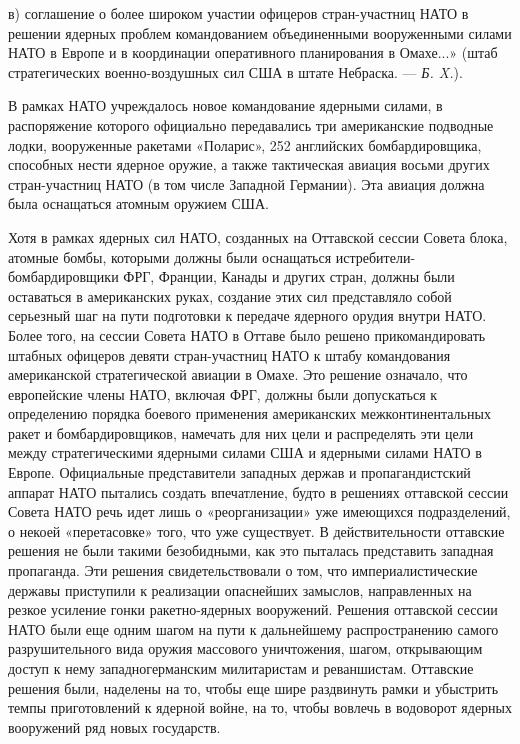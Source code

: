 \documentclass[12pt, a4paper, openany]{book}
\begin{document}
в) соглашение о более широком участии офицеров стран-участниц НАТО в решении ядерных проблем командованием объединенными вооруженными силами НАТО в Европе и в координации оперативного планирования в Омахе...» (штаб стратегических военно-воздушных сил США в штате Небраска. — \textit{Б. X.}).

В рамках НАТО учреждалось новое командование ядерными силами, в распоряжение которого официально передавались три американские подводные лодки, вооруженные ракетами «Поларис», 252 английских бомбардировщика, способных нести ядерное оружие, а также тактическая авиация восьми других стран-участниц НАТО (в том числе Западной Германии). Эта авиация должна была оснащаться атомным оружием США.

Хотя в рамках ядерных сил НАТО, созданных на Оттавской сессии Совета блока, атомные бомбы, которыми должны были оснащаться истребители-бомбардировщики ФРГ, Франции, Канады и других стран, должны были оставаться в американских руках, создание этих сил представляло собой серьезный шаг на пути подготовки к передаче ядерного орудия внутри НАТО. Более того, на сессии Совета НАТО в Оттаве было решено прикомандировать штабных офицеров девяти стран-участниц НАТО к штабу командования американской стратегической авиации в Омахе. Это решение означало, что европейские члены НАТО, включая ФРГ, должны были допускаться к определению порядка боевого применения американских межконтинентальных ракет и бомбардировщиков, намечать для них цели и распределять эти цели между стратегическими ядерными силами США и ядерными силами НАТО в Европе. Официальные представители западных держав и пропагандистский аппарат НАТО пытались создать впечатление, будто в решениях оттавской сессии Совета НАТО речь идет лишь о «реорганизации» уже имеющихся подразделений, о некоей «перетасовке» того, что уже существует. В действительности оттавские решения не были такими безобидными, как это пыталась представить западная пропаганда. Эти решения свидетельствовали о том, что империалистические державы приступили к реализации опаснейших замыслов, направленных на резкое усиление гонки ракетно-ядерных вооружений. Решения оттавской сессии НАТО были еще одним шагом на пути к дальнейшему распространению самого разрушительного вида оружия массового уничтожения, шагом, открывающим доступ к нему западногерманским милитаристам и реваншистам. Оттавские решения были, наделены на то, чтобы еще шире раздвинуть рамки и убыстрить темпы приготовлений к ядерной войне, на то, чтобы вовлечь в водоворот ядерных вооружений ряд новых государств.
\end{document}

